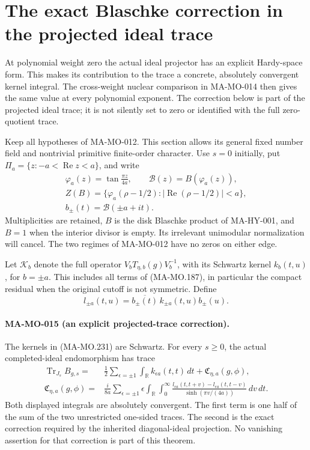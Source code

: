 \section{The exact Blaschke correction in the projected ideal trace}
\label{sec:projected-ideal-blaschke}

At polynomial weight zero the actual ideal projector has an
explicit Hardy-space form.  This makes its contribution to the
trace a concrete, absolutely convergent kernel integral.  The
cross-weight nuclear comparison in MA-MO-014 then gives the
same value at every polynomial exponent.  The correction below
is part of the projected ideal trace; it is not silently set
to zero or identified with the full zero-quotient trace.

Keep all hypotheses of MA-MO-012.  This section allows its
general fixed number field and nontrivial primitive finite-order
character.  Use \(s=0\) initially, put
\(\Pi_a=\{z:-a<\operatorname{Re}z<a\}\), and write
\[
 \begin{gathered}
 \varphi_a(z)=\tan\frac{\pi z}{4a},\qquad
 \mathcal B(z)=B(\varphi_a(z)),\\
 Z(B)=\{\varphi_a(\rho-1/2):
                    |\operatorname{Re}(\rho-1/2)|<a\},\\
 b_\pm(t)=\mathcal B(\pm a+it).
 \end{gathered}
 \tag{MA-MO.230}
\]
Multiplicities are retained, \(B\) is the disk Blaschke product
of MA-HY-001, and \(B=1\) when the interior divisor is empty.
Its irrelevant unimodular normalization will cancel.  The
two regimes of MA-MO-012 have no zeros on either edge.

Let \(\mathcal K_b\) denote the full operator
\(V_bT_{\eta,b}(g)V_b^{-1}\), with its Schwartz kernel
\(k_b(t,u)\), for \(b=\pm a\).  This includes all terms of
(MA-MO.187), in particular the compact residual when the
original cutoff is not symmetric.  Define
\[
 l_{\pm a}(t,u)=\overline{b_\pm(t)}\,k_{\pm a}(t,u)b_\pm(u).
 \tag{MA-MO.231}
\]

\paragraph{MA-MO-015 (an explicit projected-trace correction).}
The kernels in (MA-MO.231) are Schwartz.  For every \(s\ge0\),
the actual completed-ideal endomorphism has trace
\[
 \begin{aligned}
 \operatorname{Tr}_{J_s}B_{g,s}
  ={}&\frac12\sum_{\epsilon=\pm1}
              \int_{\mathbb R} k_{\epsilon a}(t,t)\,dt
                         +\mathfrak C_{\eta,a}(g,\phi),\\
 \mathfrak C_{\eta,a}(g,\phi)
  ={}&\frac{i}{8a}\sum_{\epsilon=\pm1}\epsilon
       \int_{\mathbb R}\int_0^\infty
       \frac{l_{\epsilon a}(t,t+v)-l_{\epsilon a}(t,t-v)}
                         {\sinh(\pi v/(4a))}\,dv\,dt .
 \end{aligned}
 \tag{MA-MO.232}
\]
Both displayed integrals are absolutely convergent.  The first
term is one half of the sum of the two unrestricted one-sided
traces.  The second is the exact correction required by the
inherited diagonal-ideal projection.  No vanishing assertion
for that correction is part of this theorem.

